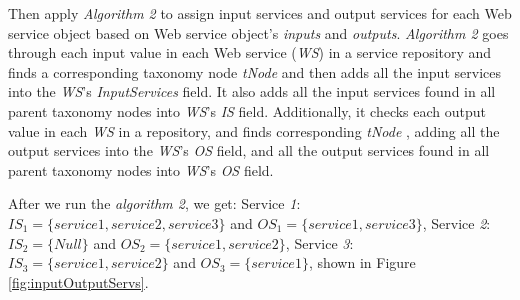 Then apply \emph{Algorithm 2} to assign input services and output services for each Web service object based on Web service object's \emph{inputs} and \emph{outputs}. \emph{Algorithm 2} goes through each input value in each Web service (\emph{WS}) in a service repository and finds a corresponding taxonomy node \emph{tNode} and then adds all the input services into the \emph{WS}'s \emph{InputServices} field. It also adds all the input services found in all parent taxonomy nodes into \emph{WS}'s \emph{IS} field. Additionally, it checks each output value in each \emph{WS} in a repository, and finds corresponding \emph{tNode} , adding all the output services into the \emph{WS}'s \emph{OS} field, and all the output services found in all parent taxonomy nodes into \emph{WS}'s \emph{OS} field.
\begin{example}
\noindent
After we run the \emph{algorithm 2}, we get: 
Service \emph{1}: $IS_1 = \{service 1, service 2, service 3\}$ and
 $OS_1 = \{service 1, service 3\}$,
Service \emph{2}: $IS_2 = \{Null\}$ and
$OS_2 = \{service 1, service 2\}$,
Service \emph{3}: $IS_3 = \{service 1, service 2\}$ and
 $OS_3 = \{service 1\}$, shown in Figure \ref{fig:inputOutputServs}.
\end{example}

